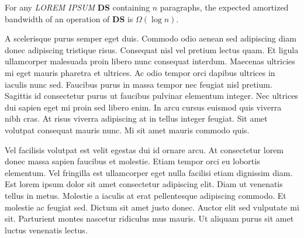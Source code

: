 \begin{thm}[informal]
\label{thm:inform}

  For any \textit{LOREM IPSUM} \textbf{DS}
	containing $n$ paragraphs, the expected amortized bandwidth of an operation of
	\textbf{DS} is $\Omega(\log n)$.

\end{thm}

A scelerisque purus semper eget duis. Commodo odio aenean sed adipiscing diam
donec adipiscing tristique risus. Consequat nisl vel pretium lectus quam. Et
ligula ullamcorper malesuada proin libero nunc consequat interdum. Maecenas
ultricies mi eget mauris pharetra et ultrices. Ac odio tempor orci dapibus
ultrices in iaculis nunc sed. Faucibus purus in massa tempor nec feugiat nisl
pretium. Sagittis id consectetur purus ut faucibus pulvinar elementum integer.
Nec ultrices dui sapien eget mi proin sed libero enim. In arcu cursus euismod
quis viverra nibh cras. At risus viverra adipiscing at in tellus integer
feugiat. Sit amet volutpat consequat mauris nunc. Mi sit amet mauris commodo
quis.

Vel facilisis volutpat est velit egestas dui id ornare arcu. At consectetur
lorem donec massa sapien faucibus et molestie. Etiam tempor orci eu lobortis
elementum. Vel fringilla est ullamcorper eget nulla facilisi etiam dignissim
diam. Est lorem ipsum dolor sit amet consectetur adipiscing elit. Diam ut
venenatis tellus in metus. Molestie a iaculis at erat pellentesque adipiscing
commodo. Et molestie ac feugiat sed. Dictum sit amet justo donec. Auctor elit
sed vulputate mi sit. Parturient montes nascetur ridiculus mus mauris. Ut
aliquam purus sit amet luctus venenatis lectus.

